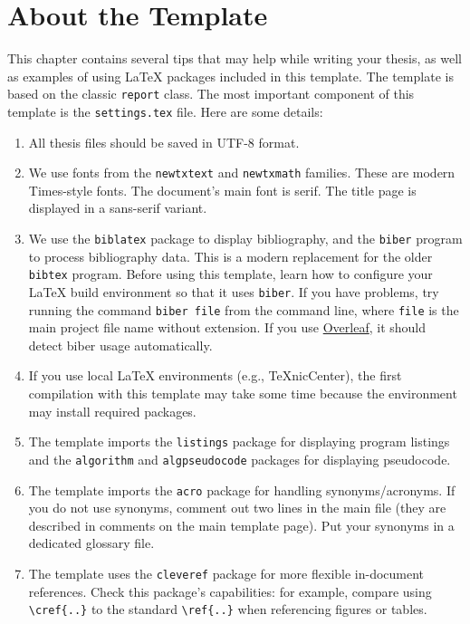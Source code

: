 \chapter{About the Template}
\label{chapt:Przyklady}

This chapter contains several tips that may help while writing your thesis,
as well as examples of using LaTeX packages included in this template.
The template is based on the classic \texttt{report} class. The most important component of this template is the \texttt{settings.tex} file.
Here are some details:
\begin{enumerate}

\item All thesis files should be saved in UTF-8 format.

\item We use fonts from the \texttt{newtxtext} and \texttt{newtxmath} families. These are modern Times-style fonts. The document's main font is serif. The title page is displayed in a sans-serif variant.

\item We use the \texttt{biblatex} package to display bibliography,
and the \texttt{biber} program to process bibliography data. This is a modern replacement for the older \texttt{bibtex} program. Before using this template, learn how to configure your LaTeX build environment so that it uses \texttt{biber}. If you have problems, try running the command \texttt{biber file} from the command line, where \texttt{file} is the main project file name without extension.
If you use \href{https://www.overleaf.com/}{Overleaf}, it should detect biber usage automatically.

\item If you use local LaTeX environments (e.g., TeXnicCenter), the first compilation with this template may take some time because the environment may install required packages.

\item The template imports the \texttt{listings} package for displaying program listings and the \texttt{algorithm} and \texttt{algpseudocode} packages for displaying pseudocode.

\item The template imports the \texttt{acro} package for handling synonyms/acronyms. If you do not use synonyms, comment out two lines in the main file (they are described in comments on the main template page). Put your synonyms in a dedicated glossary file.

\item The template uses the \texttt{cleveref} package for more flexible in-document references. Check this package's capabilities: for example, compare using \verb|\cref{..}| to the standard \verb|\ref{..}| when referencing figures or tables.
\end{enumerate}


